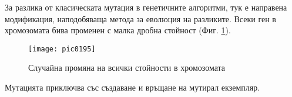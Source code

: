 За разлика от класическата мутация в генетичните алгоритми, тук е направена модификация, наподобяваща метода за еволюция на разликите. Всеки ген в хромозомата бива променен с малка дробна стойност (Фиг. \ref{fig:pic0195}). 

\begin{figure}[h]
  \centering
  \texttt{[image: pic0195]}
  \caption{Случайна промяна на всички стойности в хромозомата}
\label{fig:pic0195}
\end{figure}
\FloatBarrier

Мутацията приключва със създаване и връщане на мутирал екземпляр.
